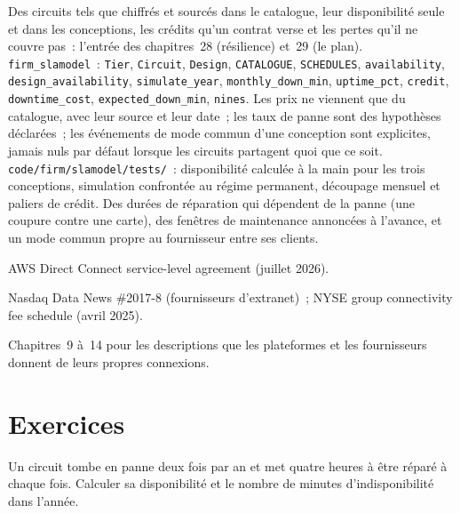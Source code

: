 \begin{build}
 Des circuits tels que chiffrés et sourcés dans le catalogue, leur disponibilité seule et dans les conceptions, les crédits qu'un contrat verse et les pertes
qu'il ne couvre pas~: l'entrée des chapitres~28 (résilience) et~29 (le plan).
 \texttt{firm\_slamodel}~: \texttt{Tier}, \texttt{Circuit}, \texttt{Design}, \texttt{CATALOGUE}, \texttt{SCHEDULES},
\texttt{availability}, \texttt{design\_availability}, \texttt{simulate\_year}, \texttt{monthly\_down\_min}, \texttt{uptime\_pct}, \texttt{credit},
\texttt{downtime\_cost}, \texttt{expected\_down\_min}, \texttt{nines}.
 Les prix ne viennent que du catalogue, avec leur source et leur date~; les taux de panne sont des hypothèses déclarées~; les événements de mode commun d'une conception
sont explicites, jamais nuls par défaut lorsque les circuits partagent quoi que ce soit.
 \texttt{code/firm/slamodel/tests/}~: disponibilité calculée à la main pour les trois conceptions, simulation confrontée au régime permanent,
découpage mensuel et paliers de crédit.
 Des durées de réparation qui dépendent de la panne (une coupure contre une carte), des fenêtres de maintenance annoncées à l'avance, et un mode commun
propre au fournisseur entre ses clients.
\end{build}

\begin{omsources}
\item AWS Direct Connect service-level agreement (juillet 2026).
\item Nasdaq Data News \#2017-8 (fournisseurs d'extranet)~; NYSE group connectivity fee schedule (avril 2025).
\item Chapitres~9 à~14 pour les descriptions que les plateformes et les fournisseurs donnent de leurs propres connexions.
\end{omsources}

\section{Exercices}

\begin{exercise}[$\star$]\label{exo:nw:buying-connectivity:1}
Un circuit tombe en panne deux fois par an et met quatre heures à être réparé à chaque fois. Calculer sa disponibilité et le nombre de minutes d'indisponibilité dans l'année.
\end{exercise}

